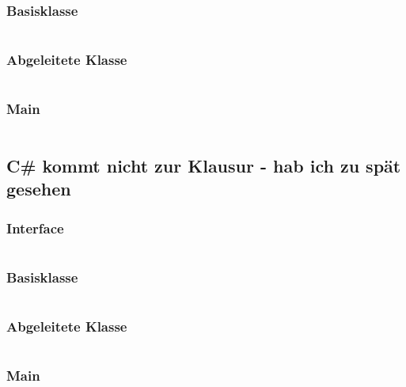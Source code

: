 \documentclass[12pt]{scrartcl}
\begin{document}
\subsubsection{Basisklasse}
\inputminted{java}{java/src/main/java/javademo/Baseclass.java}
\subsubsection{Abgeleitete Klasse}
\inputminted{java}{java/src/main/java/javademo/Derivedclass.java}
\subsubsection{Main}
\inputminted{java}{java/src/main/java/javademo/Demo.java}
\pagebreak

\subsection{C\# kommt nicht zur Klausur - hab ich zu spät gesehen}
\subsubsection{Interface}
\inputminted{csharp}{csharp/IInterface.cs}
\subsubsection{Basisklasse}
\inputminted{csharp}{csharp/Baseclass.cs}
\subsubsection{Abgeleitete Klasse}
\inputminted{csharp}{csharp/Derivedclass.cs}
\subsubsection{Main}
\inputminted{csharp}{csharp/Program.cs}
\pagebreak
\end{document}
